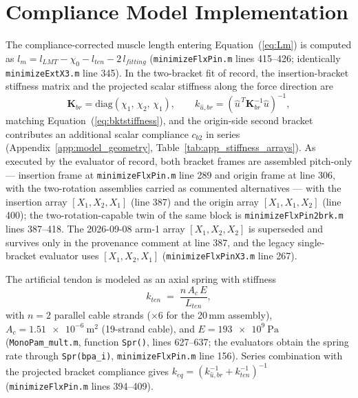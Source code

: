 \section{Compliance Model Implementation}

The compliance-corrected muscle length entering Equation~(\ref{eq:Lm}) is computed as $l_{m} = l_{LMT} - \chi_{0} - l_{ten} - 2\,l_{fitting}$ (\texttt{minimizeFlxPin.m} lines 415--426; identically \texttt{minimizeExtX3.m} line 345). In the two-bracket fit of record, the insertion-bracket stiffness matrix and the projected scalar stiffness along the force direction are
\begin{equation}
    \mathbf{K}_{br} = \mathrm{diag}(\chi_{1},\,\chi_{2},\,\chi_{1}),
    \qquad
    k_{\hat{u},br} = \left(\hat{u}^{\,T}\mathbf{K}_{br}^{-1}\hat{u}\right)^{-1},
    \label{eq:app_kbr}
\end{equation}
matching Equation~(\ref{eq:bktstiffness}), and the origin-side second bracket contributes an additional scalar compliance $c_{b2}$ in series (Appendix~\ref{app:model_geometry}, Table~\ref{tab:app_stiffness_arrays}). As executed by the evaluator of record, both bracket frames are assembled pitch-only --- insertion frame at \texttt{minimizeFlxPin.m} line 289 and origin frame at line 306, with the two-rotation assemblies carried as commented alternatives --- with the insertion array $[X_{1},X_{2},X_{1}]$ (line 387) and the origin array $[X_{1},X_{1},X_{2}]$ (line 400); the two-rotation-capable twin of the same block is \texttt{minimizeFlxPin2brk.m} lines 387--418. The 2026-09-08 arm-1 array $[X_{1},X_{2},X_{2}]$ is superseded and survives only in the provenance comment at line 387, and the legacy single-bracket evaluator uses $[X_{1},X_{2},X_{1}]$ (\texttt{minimizeFlxPinX3.m} line 267).

The artificial tendon is modeled as an axial spring with stiffness
\begin{equation}
    k_{ten} \;=\; \frac{n\,A_{c}\,E}{L_{ten}},
    \label{eq:app_tendon}
\end{equation}
with $n=2$ parallel cable strands ($\times 6$ for the 20\,mm assembly), $A_{c} = \qty{1.51e-6}{\metre\squared}$ (19-strand cable), and $E = \qty{193e9}{\pascal}$ (\texttt{MonoPam\_mult.m}, function \texttt{Spr()}, lines 627--637; the evaluators obtain the spring rate through \texttt{Spr(bpa\_i)}, \texttt{minimizeFlxPin.m} line 156). Series combination with the projected bracket compliance gives $k_{eq} = \left(k_{\hat{u},br}^{-1} + k_{ten}^{-1}\right)^{-1}$ (\texttt{minimizeFlxPin.m} lines 394--409).

